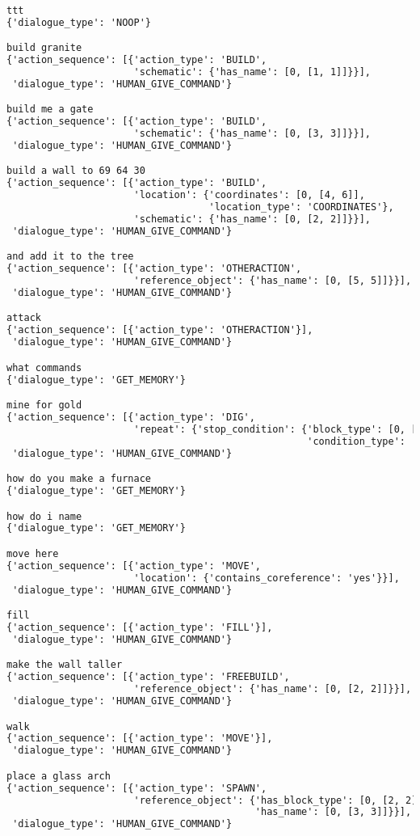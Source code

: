\begin{lstlisting}[language=TeX]

ttt
{'dialogue_type': 'NOOP'}

build granite
{'action_sequence': [{'action_type': 'BUILD',
                      'schematic': {'has_name': [0, [1, 1]]}}],
 'dialogue_type': 'HUMAN_GIVE_COMMAND'}

build me a gate
{'action_sequence': [{'action_type': 'BUILD',
                      'schematic': {'has_name': [0, [3, 3]]}}],
 'dialogue_type': 'HUMAN_GIVE_COMMAND'}

build a wall to 69 64 30
{'action_sequence': [{'action_type': 'BUILD',
                      'location': {'coordinates': [0, [4, 6]],
                                   'location_type': 'COORDINATES'},
                      'schematic': {'has_name': [0, [2, 2]]}}],
 'dialogue_type': 'HUMAN_GIVE_COMMAND'}

and add it to the tree
{'action_sequence': [{'action_type': 'OTHERACTION',
                      'reference_object': {'has_name': [0, [5, 5]]}}],
 'dialogue_type': 'HUMAN_GIVE_COMMAND'}

attack
{'action_sequence': [{'action_type': 'OTHERACTION'}],
 'dialogue_type': 'HUMAN_GIVE_COMMAND'}

what commands
{'dialogue_type': 'GET_MEMORY'}

mine for gold
{'action_sequence': [{'action_type': 'DIG',
                      'repeat': {'stop_condition': {'block_type': [0, [2, 2]],
                                                    'condition_type': 'ADJACENT_TO_BLOCK_TYPE'}}}],
 'dialogue_type': 'HUMAN_GIVE_COMMAND'}

how do you make a furnace
{'dialogue_type': 'GET_MEMORY'}

how do i name
{'dialogue_type': 'GET_MEMORY'}

move here
{'action_sequence': [{'action_type': 'MOVE',
                      'location': {'contains_coreference': 'yes'}}],
 'dialogue_type': 'HUMAN_GIVE_COMMAND'}

fill
{'action_sequence': [{'action_type': 'FILL'}],
 'dialogue_type': 'HUMAN_GIVE_COMMAND'}

make the wall taller
{'action_sequence': [{'action_type': 'FREEBUILD',
                      'reference_object': {'has_name': [0, [2, 2]]}}],
 'dialogue_type': 'HUMAN_GIVE_COMMAND'}

walk
{'action_sequence': [{'action_type': 'MOVE'}],
 'dialogue_type': 'HUMAN_GIVE_COMMAND'}

place a glass arch
{'action_sequence': [{'action_type': 'SPAWN',
                      'reference_object': {'has_block_type': [0, [2, 2]],
                                           'has_name': [0, [3, 3]]}}],
 'dialogue_type': 'HUMAN_GIVE_COMMAND'}


\end{lstlisting}
